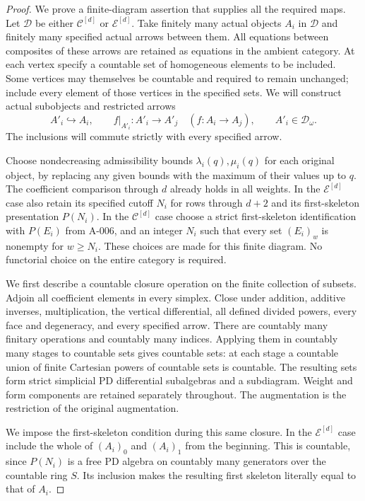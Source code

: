 \begin{proof}
We prove a finite-diagram assertion that supplies all the required
maps. Let $\mathcal D$ be either $\mathcal C^{[d]}$ or
$\mathcal E^{[d]}$. Take finitely many actual objects $A_i$ in
$\mathcal D$ and finitely many specified actual arrows between
them. All equations between composites of these arrows are
retained as equations in the ambient category. At each vertex
specify a countable set of homogeneous elements to be included.
Some vertices may themselves be countable and required to remain
unchanged; include every element of those vertices in the specified
sets. We will construct actual subobjects and restricted arrows
\[
 A'_i\hookrightarrow A_i,\qquad
 f|_{A'_i}:A'_i\longrightarrow A'_j\quad(f:A_i\to A_j),
 \qquad A'_i\in\mathcal D_\omega.
 \tag{S09.156}
\]
The inclusions will commute strictly with every specified arrow.

Choose nondecreasing admissibility bounds $\lambda_i(q),\mu_i(q)$
for each original object, by replacing any given bounds with the
maximum of their values up to $q$. The coefficient comparison
through $d$ already holds in all weights. In the
$\mathcal E^{[d]}$ case also retain its specified cutoff $N_i$
for rows through $d+2$ and its first-skeleton presentation $P(N_i)$.
In the $\mathcal C^{[d]}$ case choose a strict first-skeleton
identification with $P(E_i)$ from A-006, and an integer $N_i$
such that every set $(E_i)_w$ is nonempty for $w\geq N_i$.
These choices are made for this finite diagram. No functorial
choice on the entire category is required.

We first describe a countable closure operation on the finite
collection of subsets. Adjoin all coefficient elements in every
simplex. Close under addition, additive inverses, multiplication,
the vertical differential, all defined divided powers, every face
and degeneracy, and every specified arrow. There are countably
many finitary operations and countably many indices. Applying
them in countably many stages to countable sets gives countable
sets: at each stage a countable union of finite Cartesian powers
of countable sets is countable. The resulting sets form strict
simplicial PD differential subalgebras and a subdiagram. Weight
and form components are retained separately throughout. The
augmentation is the restriction of the original augmentation.

We impose the first-skeleton condition during this same closure.
In the $\mathcal E^{[d]}$ case include the whole of $(A_i)_0$
and $(A_i)_1$ from the beginning. This is countable, since
$P(N_i)$ is a free PD algebra on countably many generators over
the countable ring $S$. Its inclusion makes the resulting first
skeleton literally equal to that of $A_i$.


\end{proof}
